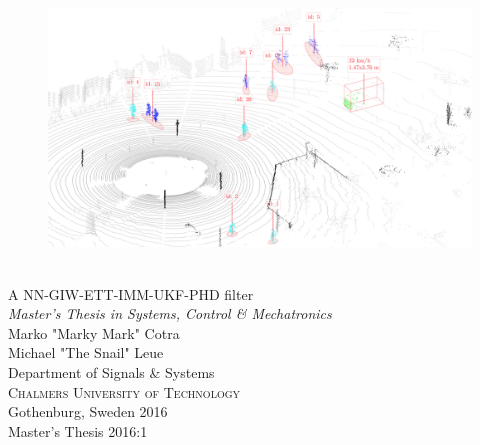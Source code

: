 \begin{titlepage}

\mbox{}
\vfill
\addtolength{\voffset}{2cm}
\begin{flushleft}
\begin{figure}
    \centering
    \vspace{5mm}
    \includegraphics[width = 1\linewidth]{include/images/frontFin.png}
\end{figure}
	{ \\[0.5cm]
	{\Large A NN-GIW-ETT-IMM-UKF-PHD filter} \\[0.5cm]
	\emph{\Large Master's Thesis in Systems, Control \& Mechatronics} \\[.8cm]
	
	{\huge Marko "Marky Mark" Cotra\\ Michael "The Snail" Leue}\\[.8cm]
	
	{\Large Department of Signals \& Systems \\
	\textsc{Chalmers University of Technology} \\
	Gothenburg, Sweden 2016 \\
	Master's Thesis 2016:1\\
	} 
	}
\end{flushleft}

\end{titlepage}
\ClearShipoutPicture

\pagestyle{empty}
\newpage
\clearpage
\mbox{}
\newpage
\clearpage
\thispagestyle{empty}


